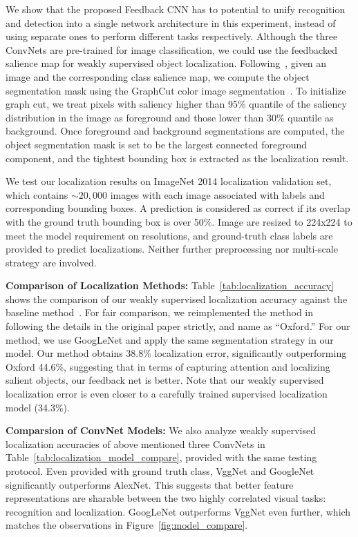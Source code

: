 We show that the proposed Feedback CNN has to potential to unify recognition and detection into a single network architecture in this experiment, instead of using separate ones to perform different tasks respectively. Although the three ConvNets are pre-trained for image classification, we could use the feedbacked salience map for weakly supervised object localization. Following~\cite{simonyan2013deep}, given an image and the corresponding class salience map, we compute the object segmentation mask using the GraphCut color image segmentation~\cite{yuri2001interactive}. To initialize graph cut, we treat pixels with saliency higher than 95\% quantile of the saliency distribution in the image as foreground and those lower than 30\% quantile as background. Once foreground and background segmentations are computed, the object segmentation mask is set to be the largest connected foreground component, and the tightest bounding box is extracted as the localization result.

We test our localization results on ImageNet 2014 localization validation set, which contains $\sim20,000$ images with each image associated with labels and corresponding bounding boxes. A prediction is considered as correct if its overlap with the ground truth bounding box is over 50\%. Image are resized  to 224x224 to meet the model requirement on resolutions, and ground-truth class labels are provided to predict localizations. Neither further preprocessing nor multi-scale strategy are involved.

\textbf{Comparison of Localization Methods:} Table~\ref{tab:localization_accuracy} shows the comparison of our weakly supervised localization accuracy against the baseline method~\cite{simonyan2013deep}. For fair comparison, we reimplemented the method in~\cite{simonyan2013deep} following the details in the original paper strictly, and name as ``Oxford.'' For our method, we use GoogLeNet and apply the same segmentation strategy in our model. Our method obtains 38.8\% localization error, significantly outperforming Oxford 44.6\%, suggesting that in terms of capturing attention and localizing salient objects, our feedback net is better. Note that our weakly supervised localization error is even closer to a carefully trained supervised localization model (34.3\%).

\textbf{Comparsion of ConvNet Models:} We also analyze  weakly supervised localization accuracies of above mentioned three ConvNets in Table~\ref{tab:localization_model_compare}, provided with the same testing protocol. Even provided with ground truth class, VggNet and GoogleNet significantly outperforms AlexNet.
This suggests that better feature representations are sharable between the two highly correlated visual tasks: recognition and localization. GoogLeNet outperforms VggNet even further, which matches the observations in Figure~\ref{fig:model_compare}.

